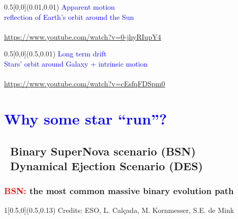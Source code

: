 \documentclass[xcolor=dvipsnames,professionalfonts, aspectratio=169]{beamer}
\begin{document}
\begin{frame}[c,plain]
  \begin{textblock}{0.5}[0,0](0.01,0.01)
    \centering
    \textcolor{Blue}{{\large Apparent motion}\\
      {\small reflection of Earth's orbit around the Sun}}\\[70pt]
    \vfill
      \\
      \textcolor{gray!50}{\tiny \url{https://www.youtube.com/watch?v=0-jhyRIupY4}}
    \end{textblock}
    \begin{textblock}{0.5}[0,0](0.5,0.01)
      \centering
      \textcolor{Blue}{{\large Long term drift}\\
        {\small Stars' orbit around Galaxy + intrinsic motion}}\\[68pt]
      \vfill
      \\
      \textcolor{gray!50}{\tiny \url{https://www.youtube.com/watch?v=cEsfqFDSpm0}}
  \end{textblock}
\end{frame}



\section{\textcolor{Blue}{Why some star ``run''?}}
\subsection{\textcolor{Blue}{\textbullet}~Binary SuperNova scenario
  (BSN) \\\textcolor{Blue}{\textbullet}~Dynamical Ejection Scenario (DES)}


\begin{frame}
  \frametitle{\textcolor{red}{BSN:} the most common massive binary evolution path}
  \centering
  \vspace*{8pt}


  \begin{textblock}{1}[0.5,0](0.5,0.13)
    \textcolor{gray!50}{\tiny Credits: ESO, L. Calçada, M. Kornmesser, S.E. de Mink}
  \end{textblock}
\end{frame}
\end{document}
